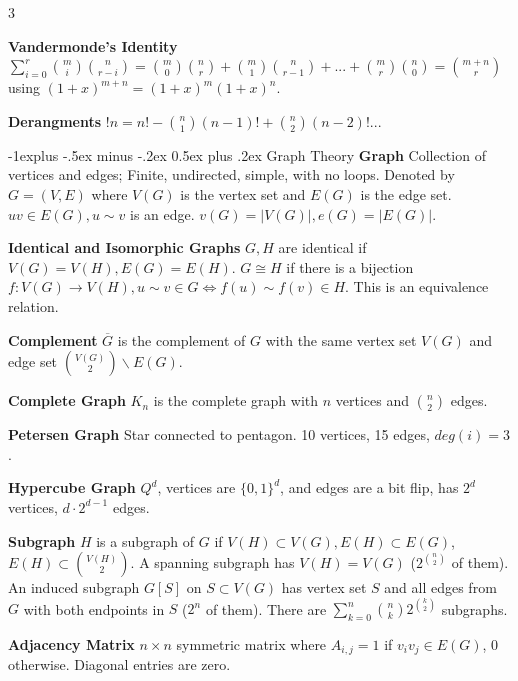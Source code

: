 \documentclass[10pt, landscape]{article}
\makeatletter
\renewcommand{\section}{\@startsection{section}{1}{0mm}%
                                {-1ex plus -.5ex minus -.2ex}%
                                {0.5ex plus .2ex}%
                                {\normalfont\large\bfseries}}
\renewcommand{\section}{\@startsection{section}{2}{0mm}%
                                {-1explus -.5ex minus -.2ex}%
                                {0.5ex plus .2ex}%
                                {\normalfont\normalsize\bfseries}}
\makeatother
\begin{document}
\begin{multicols*}{3}




\textbf{Vandermonde's Identity} $\sum_{i=0}^r{m \choose i}{n \choose r-i}={m\choose 0}{n \choose r}+{m \choose 1}{n \choose r-1}+...+{m \choose r}{n \choose 0}={m+n \choose r}$ using $(1+x)^{m+n}=(1+x)^m(1+x)^n$.

\textbf{Derangments} $!n=n!-{n \choose 1}(n-1)!+{n \choose 2}(n-2)!...$

\section{Graph Theory}
\textbf{Graph} Collection of vertices and edges; Finite, undirected, simple, with no loops. Denoted by $G=(V, E)$ where $V(G)$ is the vertex set and $E(G)$ is the edge set. $uv \in E(G), u \sim v$ is an edge. $v(G)=|V(G)|, e(G)=|E(G)|$.

\textbf{Identical and Isomorphic Graphs} $G, H$ are identical if $V(G)=V(H), E(G)=E(H)$. $G \cong H$ if there is a bijection $f:V(G)\rightarrow V(H), u \sim v \in G \Leftrightarrow f(u) \sim f(v) \in H$. This is an equivalence relation.

\textbf{Complement} $\overline{G}$ is the complement of $G$ with the same vertex set $V(G)$ and edge set ${V(G) \choose 2} \backslash E(G)$.

\textbf{Complete Graph} $K_n$ is the complete graph with $n$ vertices and $n \choose 2$ edges.

\textbf{Petersen Graph} Star connected to pentagon. 10 vertices, 15 edges, $deg(i)=3$.

\textbf{Hypercube Graph} $Q^d$, vertices are $\{0,1\}^d$, and edges are a bit flip, has $2^d$ vertices, $d \cdot 2^{d-1}$ edges.

\textbf{Subgraph} $H$ is a subgraph of $G$ if $V(H) \subset V(G), E(H) \subset E(G)$, $E(H) \subset {V(H) \choose 2}$. A spanning subgraph has $V(H)=V(G)$ ($2^{n \choose 2}$ of them). An induced subgraph $G[S]$ on $S \subset V(G)$ has vertex set $S$ and all edges from $G$ with both endpoints in $S$ ($2^n$ of them). There are $\sum_{k=0}^n {n \choose k}2^{k \choose 2}$ subgraphs.

\textbf{Adjacency Matrix} $n\times n$ symmetric matrix where $A_{i,j}=1$ if $v_iv_j \in E(G)$, $0$ otherwise. Diagonal entries are zero.


\end{multicols*}
\end{document}
